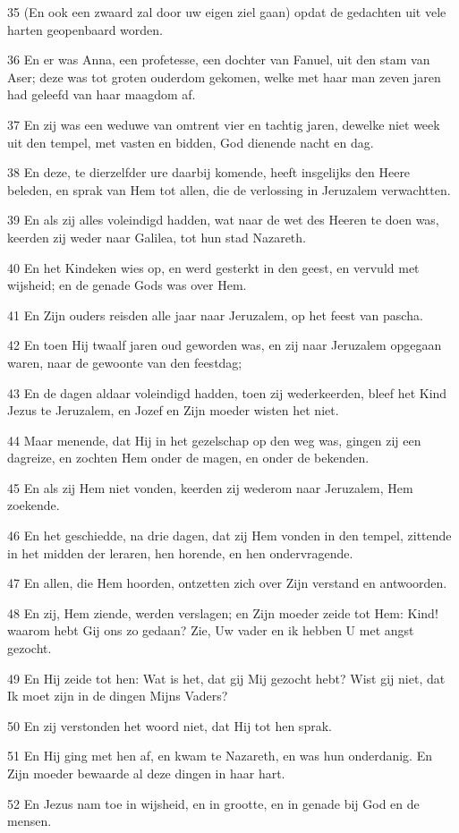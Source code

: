 \par 35 (En ook een zwaard zal door uw eigen ziel gaan) opdat de gedachten uit vele harten geopenbaard worden.
\par 36 En er was Anna, een profetesse, een dochter van Fanuel, uit den stam van Aser; deze was tot groten ouderdom gekomen, welke met haar man zeven jaren had geleefd van haar maagdom af.
\par 37 En zij was een weduwe van omtrent vier en tachtig jaren, dewelke niet week uit den tempel, met vasten en bidden, God dienende nacht en dag.
\par 38 En deze, te dierzelfder ure daarbij komende, heeft insgelijks den Heere beleden, en sprak van Hem tot allen, die de verlossing in Jeruzalem verwachtten.
\par 39 En als zij alles voleindigd hadden, wat naar de wet des Heeren te doen was, keerden zij weder naar Galilea, tot hun stad Nazareth.
\par 40 En het Kindeken wies op, en werd gesterkt in den geest, en vervuld met wijsheid; en de genade Gods was over Hem.
\par 41 En Zijn ouders reisden alle jaar naar Jeruzalem, op het feest van pascha.
\par 42 En toen Hij twaalf jaren oud geworden was, en zij naar Jeruzalem opgegaan waren, naar de gewoonte van den feestdag;
\par 43 En de dagen aldaar voleindigd hadden, toen zij wederkeerden, bleef het Kind Jezus te Jeruzalem, en Jozef en Zijn moeder wisten het niet.
\par 44 Maar menende, dat Hij in het gezelschap op den weg was, gingen zij een dagreize, en zochten Hem onder de magen, en onder de bekenden.
\par 45 En als zij Hem niet vonden, keerden zij wederom naar Jeruzalem, Hem zoekende.
\par 46 En het geschiedde, na drie dagen, dat zij Hem vonden in den tempel, zittende in het midden der leraren, hen horende, en hen ondervragende.
\par 47 En allen, die Hem hoorden, ontzetten zich over Zijn verstand en antwoorden.
\par 48 En zij, Hem ziende, werden verslagen; en Zijn moeder zeide tot Hem: Kind! waarom hebt Gij ons zo gedaan? Zie, Uw vader en ik hebben U met angst gezocht.
\par 49 En Hij zeide tot hen: Wat is het, dat gij Mij gezocht hebt? Wist gij niet, dat Ik moet zijn in de dingen Mijns Vaders?
\par 50 En zij verstonden het woord niet, dat Hij tot hen sprak.
\par 51 En Hij ging met hen af, en kwam te Nazareth, en was hun onderdanig. En Zijn moeder bewaarde al deze dingen in haar hart.
\par 52 En Jezus nam toe in wijsheid, en in grootte, en in genade bij God en de mensen.

